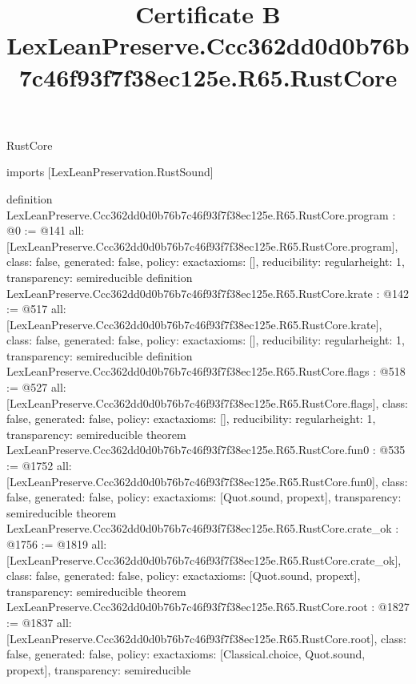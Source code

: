 \begin{lexlean}{RustCore}
\title{Certificate B LexLeanPreserve.Ccc362dd0d0b76b7c46f93f7f38ec125e.R65.RustCore}
\begin{coremodule}
imports [LexLeanPreservation.RustSound]

definition LexLeanPreserve.Ccc362dd0d0b76b7c46f93f7f38ec125e.R65.RustCore.program : @0 := @141 {
  all: [LexLeanPreserve.Ccc362dd0d0b76b7c46f93f7f38ec125e.R65.RustCore.program],
  class: false,
  generated: false,
  policy: exact{axioms: []},
  reducibility: regular{height: 1},
  transparency: semireducible
}
definition LexLeanPreserve.Ccc362dd0d0b76b7c46f93f7f38ec125e.R65.RustCore.krate : @142 := @517 {
  all: [LexLeanPreserve.Ccc362dd0d0b76b7c46f93f7f38ec125e.R65.RustCore.krate],
  class: false,
  generated: false,
  policy: exact{axioms: []},
  reducibility: regular{height: 1},
  transparency: semireducible
}
definition LexLeanPreserve.Ccc362dd0d0b76b7c46f93f7f38ec125e.R65.RustCore.flags : @518 := @527 {
  all: [LexLeanPreserve.Ccc362dd0d0b76b7c46f93f7f38ec125e.R65.RustCore.flags],
  class: false,
  generated: false,
  policy: exact{axioms: []},
  reducibility: regular{height: 1},
  transparency: semireducible
}
theorem LexLeanPreserve.Ccc362dd0d0b76b7c46f93f7f38ec125e.R65.RustCore.fun0 : @535 := @1752 {
  all: [LexLeanPreserve.Ccc362dd0d0b76b7c46f93f7f38ec125e.R65.RustCore.fun0],
  class: false,
  generated: false,
  policy: exact{axioms: [Quot.sound, propext]},
  transparency: semireducible
}
theorem LexLeanPreserve.Ccc362dd0d0b76b7c46f93f7f38ec125e.R65.RustCore.crate_ok : @1756 := @1819 {
  all: [LexLeanPreserve.Ccc362dd0d0b76b7c46f93f7f38ec125e.R65.RustCore.crate_ok],
  class: false,
  generated: false,
  policy: exact{axioms: [Quot.sound, propext]},
  transparency: semireducible
}
theorem LexLeanPreserve.Ccc362dd0d0b76b7c46f93f7f38ec125e.R65.RustCore.root : @1827 := @1837 {
  all: [LexLeanPreserve.Ccc362dd0d0b76b7c46f93f7f38ec125e.R65.RustCore.root],
  class: false,
  generated: false,
  policy: exact{axioms: [Classical.choice, Quot.sound, propext]},
  transparency: semireducible
}


\end{coremodule}
\end{lexlean}
